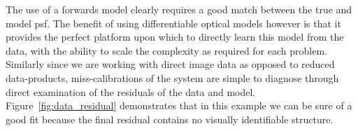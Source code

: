 \documentclass[]{spieman}
\begin{document}
The use of a forwards model clearly requires a good match between the true and model \ac{psf}. The benefit of using differentiable optical models however is that it provides the perfect platform upon which to directly learn this model from the data, with the ability to scale the complexity as required for each problem. Similarly since we are working with direct image data as opposed to reduced data-products, miss-calibrations of the system are simple to diagnose through direct examination of the residuals of the data and model. Figure~\ref{fig:data_residual} demonstrates that in this example we can be sure of a good fit because the final residual contains no visually identifiable structure.



\end{document}
